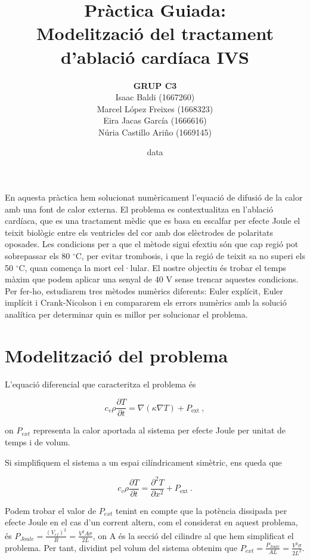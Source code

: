 \documentclass[11pt]{article}
\title{\Huge\bfseries Pràctica Guiada: \\ Modelització del tractament \\ d’ablació cardíaca IVS \\[1ex] \Large}
\author{\begin{tabular}{c}
\textbf{GRUP C3} \\
Isaac Baldi (1667260)\\
Marcel López Freixes (1668323) \\
Eira Jacas García (1666616) \\
Núria Castillo Ariño (1669145)
\end{tabular}}
\date{data}
\begin{document}
\maketitle

En aquesta pràctica hem solucionat numèricament l'equació de difusió de la calor amb una font de calor externa. El problema es contextualitza en l'ablació cardíaca, que es una tractament mèdic que es basa en escalfar per efecte Joule el teixit biològic entre els ventricles del cor amb dos elèctrodes de polaritats oposades. Les condicions per a que el mètode sigui efextiu són que cap regió pot sobrepassar els 80 $^\circ$C, per evitar trombosis, i que la regió de teixit sa no superi els 50 $^\circ$C, quan comença la mort cel·lular. El nostre objectiu és trobar el temps màxim que podem aplicar una senyal de 40 V sense trencar aquestes condicions. Per fer-ho, estudiarem tres mètodes numèrics diferents: Euler explícit, Euler implícit i Crank-Nicolson i en compararem els errors numèrics amb la solució analítica per determinar quin es millor per solucionar el problema.

\section{Modelització del problema} 

L'equació diferencial que caracteritza el problema és

\begin{equation}
    c_v \rho \frac{\partial T}{\partial t} = \nabla(\kappa \nabla T) + P_{\text{ext}} \ ,
\label{eq: eq_inicial}
\end{equation}

on $P_{ext}$ representa la calor aportada al sistema per efecte Joule per unitat de temps i de volum. 

Si simplifiquem el sistema a un espai cilíndricament simètric, ens queda que

\begin{equation}
    c_v \rho \frac{\partial T}{\partial t} = \frac{\partial^2 T}{\partial x^2} + P_{\text{ext}} \ .
\label{eq: eq_inicial_cilindriques}
\end{equation}

Podem trobar el valor de $P_{ext}$ tenint en compte que la potència dissipada per efecte Joule en el cas d'un corrent altern, com el considerat en aquest problema, és $P_{Joule}=\frac{(V_{ef})^2}{R}=\frac{V^2 A \sigma}{2L}$, on A és la secció del cilindre al que hem simplificat el problema. Per tant, dividint pel volum del sistema obtenim que $P_{ext}=\frac{P_{Joule}}{AL}=\frac{V^2 \sigma}{2L^2}$.
\end{document}
